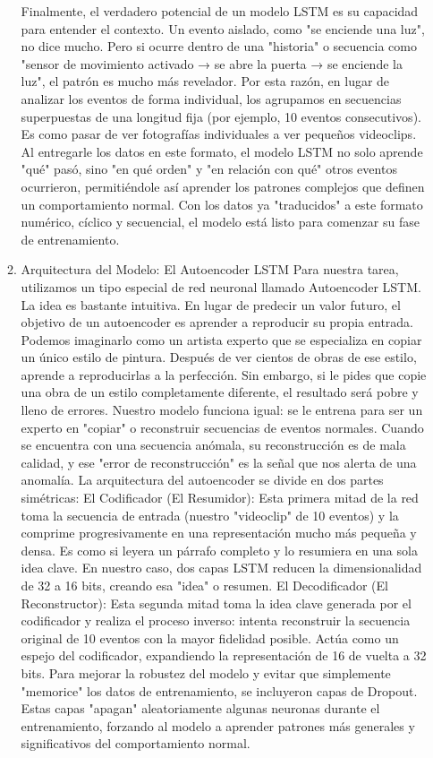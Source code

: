 \begin{enumerate}
\begin{enumerate}
                Finalmente, el verdadero potencial de un modelo LSTM es su capacidad para entender el contexto. Un evento aislado, como "se enciende una luz", no dice mucho. Pero si ocurre dentro de una "historia" o secuencia como "sensor de movimiento activado → se abre la puerta → se enciende la luz", el patrón es mucho más revelador.
                Por esta razón, en lugar de analizar los eventos de forma individual, los agrupamos en secuencias superpuestas de una longitud fija (por ejemplo, 10 eventos consecutivos). Es como pasar de ver fotografías individuales a ver pequeños videoclips.
                Al entregarle los datos en este formato, el modelo LSTM no solo aprende "qué" pasó, sino "en qué orden" y "en relación con qué" otros eventos ocurrieron, permitiéndole así aprender los patrones complejos que definen un comportamiento normal. Con los datos ya "traducidos" a este formato numérico, cíclico y secuencial, el modelo está listo para comenzar su fase de entrenamiento.

          \item Arquitectura del Modelo: El Autoencoder LSTM
                Para nuestra tarea, utilizamos un tipo especial de red neuronal llamado Autoencoder LSTM. La idea es bastante intuitiva. En lugar de predecir un valor futuro, el objetivo de un autoencoder es aprender a reproducir su propia entrada.
                Podemos imaginarlo como un artista experto que se especializa en copiar un único estilo de pintura. Después de ver cientos de obras de ese estilo, aprende a reproducirlas a la perfección. Sin embargo, si le pides que copie una obra de un estilo completamente diferente, el resultado será pobre y lleno de errores.
                Nuestro modelo funciona igual: se le entrena para ser un experto en "copiar" o reconstruir secuencias de eventos normales. Cuando se encuentra con una secuencia anómala, su reconstrucción es de mala calidad, y ese "error de reconstrucción" es la señal que nos alerta de una anomalía.
                La arquitectura del autoencoder se divide en dos partes simétricas:
                El Codificador (El Resumidor): Esta primera mitad de la red toma la secuencia de entrada (nuestro "videoclip" de 10 eventos) y la comprime progresivamente en una representación mucho más pequeña y densa. Es como si leyera un párrafo completo y lo resumiera en una sola idea clave. En nuestro caso, dos capas LSTM reducen la dimensionalidad de 32 a 16 bits, creando esa "idea" o resumen.
                El Decodificador (El Reconstructor): Esta segunda mitad toma la idea clave generada por el codificador y realiza el proceso inverso: intenta reconstruir la secuencia original de 10 eventos con la mayor fidelidad posible. Actúa como un espejo del codificador, expandiendo la representación de 16 de vuelta a 32 bits.
                Para mejorar la robustez del modelo y evitar que simplemente "memorice" los datos de entrenamiento, se incluyeron capas de Dropout. Estas capas "apagan" aleatoriamente algunas neuronas durante el entrenamiento, forzando al modelo a aprender patrones más generales y significativos del comportamiento normal.


\end{enumerate}
\end{enumerate}

